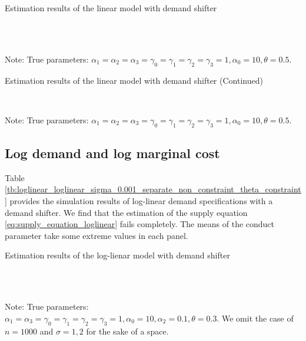 \documentclass[11pt, a4paper]{article}
\begin{document}
\begin{table}[!htbp]
  \begin{center}
      \caption{Estimation results of the linear model with demand shifter}
      \label{tb:linear_linear_sigma_1} 
      \subfloat[$\sigma=0.001$]{}\\
      \subfloat[$\sigma=0.5$]{}\\
  \end{center}\footnotesize
  Note: True parameters: $\alpha_1 = \alpha_2 = \alpha_3 = \gamma_0 = \gamma_1 = \gamma_2  = \gamma_3 = 1, \alpha_0 = 10, \theta = 0.5.$
\end{table} 

\begin{table}[!htbp]
  \ContinuedFloat  %
  \begin{center}
      \caption{Estimation results of the linear model with demand shifter (Continued)}
      \label{tb:linear_linear_sigma_1} 
      \subfloat[$\sigma=1.0$]{}\\
    \subfloat[$\sigma=2.0$]{}
  \end{center}\footnotesize
  Note: True parameters: $\alpha_1 = \alpha_2 = \alpha_3 = \gamma_0 = \gamma_1 = \gamma_2  = \gamma_3 = 1, \alpha_0 = 10, \theta = 0.5.$
\end{table} 


\subsection{Log demand and log marginal cost}
Table \ref{tb:loglinear_loglinear_sigma_0.001_separate_non_constraint_theta_constraint} provides the simulation results of log-linear demand specifications with a demand shifter. 
We find that the estimation of the supply equation \eqref{eq:supply_equation_loglinear} fails completely.
The means of the conduct parameter take some extreme values in each panel.

\begin{table}[!htbp]
  \begin{center}
      \caption{Estimation results of the log-lienar model with demand shifter}
      \label{tb:loglinear_loglinear_sigma_0.001_separate_non_constraint_non_constraint} 
      \subfloat[$\sigma=0.001$]{}\\
      \subfloat[$\sigma=0.5$]{}\\
  \end{center}\footnotesize
  Note: True parameters: $\alpha_1 = \alpha_3 = \gamma_0 = \gamma_1 = \gamma_2  = \gamma_3 = 1, \alpha_0 = 10, \alpha_2 = 0.1,  \theta = 0.3.$ We omit the case of $n=1000$ and $\sigma=1,2$ for the sake of a space.
\end{table} 
\end{document}
